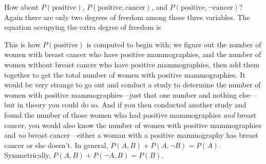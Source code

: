 { How about $P(\text{positive})$, $P(\text{positive}, \text{cancer})$, and
$P(\text{positive},\lnot\text{cancer})$? Again there are only two degrees of
freedom among these three variables. The equation occupying the extra
degree of freedom is



 This is how $P(\text{positive})$ is computed to begin with; we figure out
the number of women with breast cancer who have positive mammographies,
and the number of women without breast cancer who have positive
mammographies, then add them together to get the total number of women
with positive mammographies. It would be very strange to go out and
conduct a study to determine the number of women with positive
mammographies---just that one number and nothing else---but in theory
you could do so. And if you then conducted another study and found the
number of those women who had positive mammographies \textit{and}
breast cancer, you would also know the number of women with positive
mammographies and \textit{no} breast cancer---either a woman with a
positive mammography has breast cancer or she doesn't.
In general, $P(A,B) + P(A,\lnot B) = P(A)$. Symmetrically, $P(A,B) +
P(\lnot A,B) = P(B)$.


}
